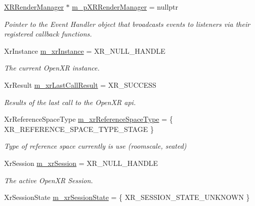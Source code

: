 \begin{DoxyCompactItemize}
\mbox{\hyperlink{class_open_x_r_provider_1_1_x_r_render_manager}{X\+R\+Render\+Manager}} $\ast$ \mbox{\hyperlink{class_open_x_r_provider_1_1_x_r_provider_a688536257f6d9329e2d431b1249a708a}{m\+\_\+p\+X\+R\+Render\+Manager}} = nullptr
\begin{DoxyCompactList}\small\item\em Pointer to the Event Handler object that broadcasts events to listeners via their registered callback functions. \end{DoxyCompactList}\item 
Xr\+Instance \mbox{\hyperlink{class_open_x_r_provider_1_1_x_r_provider_a9e1f2a85f900c81ee109c134b609a80d}{m\+\_\+xr\+Instance}} = X\+R\+\_\+\+N\+U\+L\+L\+\_\+\+H\+A\+N\+D\+LE
\begin{DoxyCompactList}\small\item\em The current Open\+XR instance. \end{DoxyCompactList}\item 
Xr\+Result \mbox{\hyperlink{class_open_x_r_provider_1_1_x_r_provider_a40f1a70863c7eec9a1d80f458a2f828a}{m\+\_\+xr\+Last\+Call\+Result}} = X\+R\+\_\+\+S\+U\+C\+C\+E\+SS
\begin{DoxyCompactList}\small\item\em Results of the last call to the Open\+XR api. \end{DoxyCompactList}\item 
Xr\+Reference\+Space\+Type \mbox{\hyperlink{class_open_x_r_provider_1_1_x_r_provider_a2d52dc8b79eca6fb9a61ac5f74520107}{m\+\_\+xr\+Reference\+Space\+Type}} = \{ X\+R\+\_\+\+R\+E\+F\+E\+R\+E\+N\+C\+E\+\_\+\+S\+P\+A\+C\+E\+\_\+\+T\+Y\+P\+E\+\_\+\+S\+T\+A\+GE \}
\begin{DoxyCompactList}\small\item\em Type of reference space currently is use (roomscale, seated) \end{DoxyCompactList}\item 
Xr\+Session \mbox{\hyperlink{class_open_x_r_provider_1_1_x_r_provider_a7f982aef09ccb7e7774168dafcfee1ce}{m\+\_\+xr\+Session}} = X\+R\+\_\+\+N\+U\+L\+L\+\_\+\+H\+A\+N\+D\+LE
\begin{DoxyCompactList}\small\item\em The active Open\+XR Session. \end{DoxyCompactList}\item 
Xr\+Session\+State \mbox{\hyperlink{class_open_x_r_provider_1_1_x_r_provider_a73f18afafd90dd8460f5f9ecc4d7f234}{m\+\_\+xr\+Session\+State}} = \{ X\+R\+\_\+\+S\+E\+S\+S\+I\+O\+N\+\_\+\+S\+T\+A\+T\+E\+\_\+\+U\+N\+K\+N\+O\+WN \}

\end{DoxyCompactItemize}
